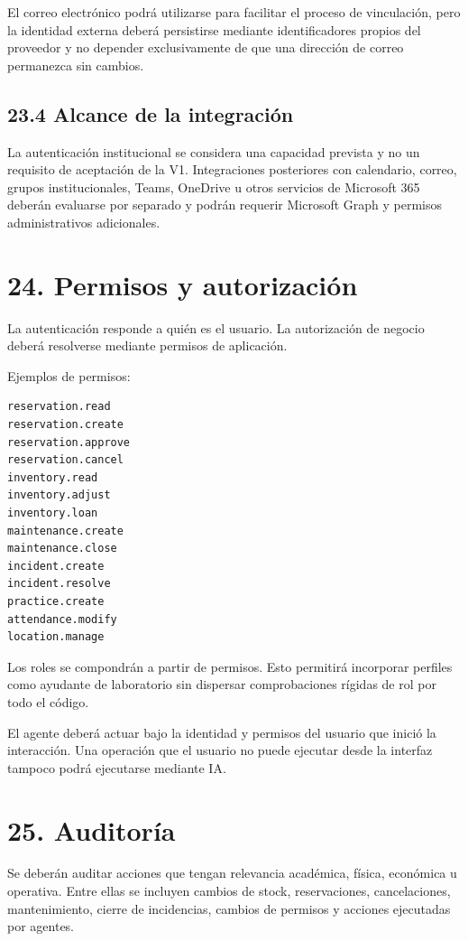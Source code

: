 \documentclass[12pt]{article}
\begin{document}
El correo electrónico podrá utilizarse para facilitar el proceso de vinculación, pero la identidad externa deberá persistirse mediante identificadores propios del proveedor y no depender exclusivamente de que una dirección de correo permanezca sin cambios.

\subsection*{23.4 Alcance de la integración}

La autenticación institucional se considera una capacidad prevista y no un requisito de aceptación de la V1. Integraciones posteriores con calendario, correo, grupos institucionales, Teams, OneDrive u otros servicios de Microsoft 365 deberán evaluarse por separado y podrán requerir Microsoft Graph y permisos administrativos adicionales.

\section*{24. Permisos y autorización}

La autenticación responde a quién es el usuario. La autorización de negocio deberá resolverse mediante permisos de aplicación.

Ejemplos de permisos:

\begin{verbatim}
reservation.read
reservation.create
reservation.approve
reservation.cancel
inventory.read
inventory.adjust
inventory.loan
maintenance.create
maintenance.close
incident.create
incident.resolve
practice.create
attendance.modify
location.manage
\end{verbatim}

Los roles se compondrán a partir de permisos. Esto permitirá incorporar perfiles como ayudante de laboratorio sin dispersar comprobaciones rígidas de rol por todo el código.

El agente deberá actuar bajo la identidad y permisos del usuario que inició la interacción. Una operación que el usuario no puede ejecutar desde la interfaz tampoco podrá ejecutarse mediante IA.

\section*{25. Auditoría}

Se deberán auditar acciones que tengan relevancia académica, física, económica u operativa. Entre ellas se incluyen cambios de stock, reservaciones, cancelaciones, mantenimiento, cierre de incidencias, cambios de permisos y acciones ejecutadas por agentes.
\end{document}
